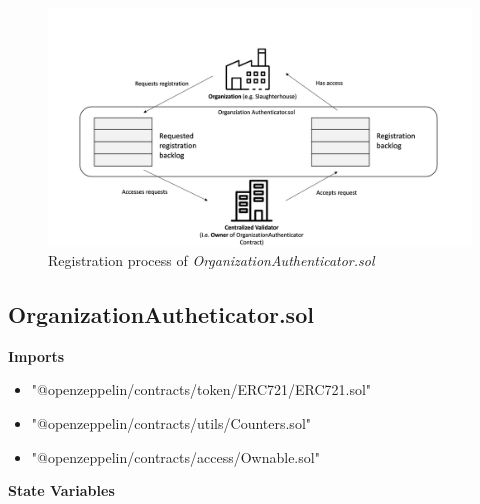 \begin{figure}[bth]
    \centering
    \includegraphics[width=1\textwidth]{images/registration_process.png}
    \caption{Registration process of \textit{OrganizationAuthenticator.sol}}
    \label{fig:registration_process}
\end{figure}

\newpage
\subsection{OrganizationAutheticator.sol}\label{se:organization_authenticator.sol}


\textbf{Imports}

\begin{itemize}
    \item "@openzeppelin/contracts/token/ERC721/ERC721.sol"
    \item "@openzeppelin/contracts/utils/Counters.sol"
    \item  "@openzeppelin/contracts/access/Ownable.sol"
\end{itemize}


\textbf{State Variables}


